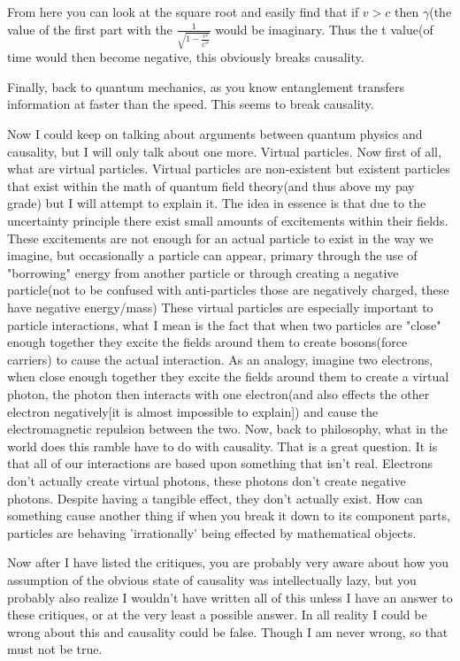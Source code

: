 \par From here you can look at the square root and easily find that if $v>c$ then $\gamma $(the value of the first part with the $\frac{1}{\sqrt{1-\frac{v^2}{C^2}}}$ would be imaginary. Thus the t value(of time would then become negative, this obviously breaks causality.
\par Finally, back to quantum mechanics, as you know entanglement transfers information at faster than the speed. This seems to break causality. 
\par Now I could keep on talking about arguments between quantum physics and causality, but I will only talk about one more. Virtual particles. Now first of all, what are virtual particles. Virtual particles are non-existent but existent particles that exist within the math of quantum field theory(and thus above my pay grade) but I will attempt to explain it. The idea in essence is that due to the uncertainty principle there exist small amounts of excitements within their fields. These excitements are not enough for an actual particle to exist in the way we imagine, but occasionally a particle can appear, primary through the use of "borrowing" energy from another particle or through creating a negative particle(not to be confused with anti-particles those are negatively charged, these have negative energy/mass) These virtual particles are especially important to particle interactions, what I mean is the fact that when two particles are "close" enough together they excite the fields around them to create bosons(force carriers) to cause the actual interaction. As an analogy, imagine two electrons, when close enough together they excite the fields around them to create a virtual photon, the photon then interacts with one electron(and also effects the other electron negatively[it is almost impossible to explain]) and cause the electromagnetic repulsion between the two. Now, back to philosophy, what in the world does this ramble have to do with causality. That is a great question. It is that all of our interactions are based upon something that isn't real. Electrons don't actually create virtual photons, these photons don't create negative photons. Despite having a tangible effect, they don't actually exist. How can something cause another thing if when you break it down to its component parts, particles are behaving 'irrationally' being effected by mathematical objects.

\par Now after I have listed the critiques, you are probably very aware about how you assumption of the obvious state of causality was intellectually lazy, but you probably also realize I wouldn't have written all of this unless I have an answer to these critiques, or at the very least a possible answer. In all reality I could be wrong about this and causality could be false. Though I am never wrong, so that must not be true.

